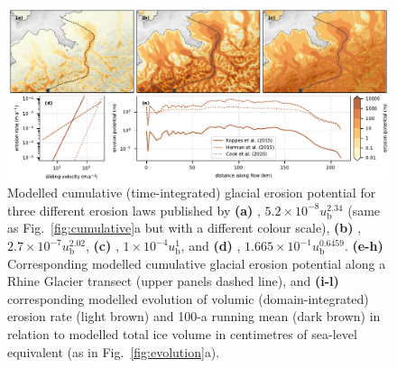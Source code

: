 \documentclass[utf8]{article}
\begin{document}
    \begin{figure}
      \centerline{\includegraphics{alpero_powerlaws}}
      \caption{%
        Modelled cumulative (time-integrated) glacial erosion potential for
        three different erosion laws published by
        \textbf{(a)} \citet{Koppes.etal.2015},
          ${5.2 \times 10^{-8} u_\mathrm{b}^{2.34}}$ (same as
          Fig.~\ref{fig:cumulative}a but with a different colour scale),
        \textbf{(b)} \citet{Herman.etal.2015},
          ${2.7 \times 10^{-7} u_\mathrm{b}^{2.02}}$,
        \textbf{(c)} \citet{Humphrey.Raymond.1994},
          ${1 \times 10^{-4} u_\mathrm{b}^{1}}$, and
        \textbf{(d)} \citet{Cook.etal.2020},
          ${1.665 \times 10^{-1} u_\mathrm{b}^{0.6459}}$.
        \textbf{(e-h)} Corresponding modelled cumulative glacial erosion
          potential along a Rhine Glacier transect (upper panels dashed line), and
        \textbf{(i-l)} corresponding modelled evolution of volumic
        (domain-integrated) erosion rate (light brown) and 100-a
        running mean (dark brown) in relation to modelled total ice volume in
        centimetres of sea-level equivalent (as in Fig.~\ref{fig:evolution}a).}
      \label{fig:powerlaws}
    \end{figure}



\end{document}
